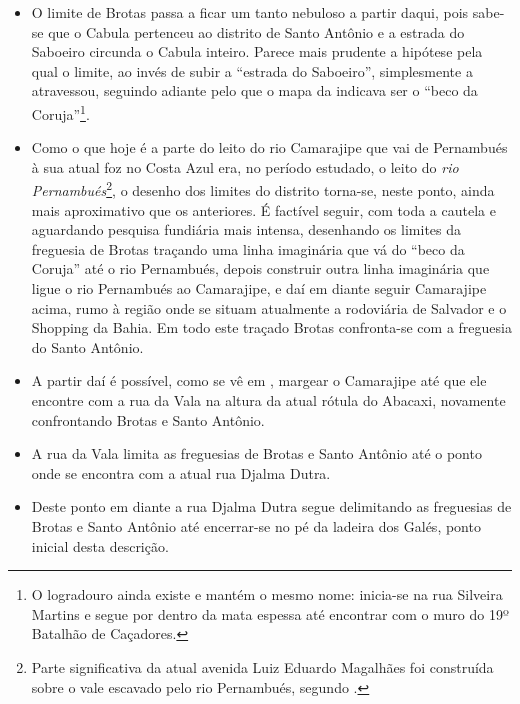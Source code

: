 \begin{itemize}
\item O limite de Brotas passa a ficar um tanto nebuloso a partir daqui, pois sabe-se que o Cabula pertenceu ao distrito de Santo Antônio e a estrada do Saboeiro circunda o Cabula inteiro. Parece mais prudente a hipótese pela qual o limite, ao invés de subir a ``estrada do Saboeiro'', simplesmente a atravessou, seguindo adiante pelo que o mapa da  indicava ser o ``beco da Coruja''\footnote{O logradouro ainda existe e mantém o mesmo nome: inicia-se na rua Silveira Martins e segue por dentro da mata espessa até encontrar com o muro do 19º Batalhão de Caçadores.}.
\item Como o que hoje é a parte do leito do rio Camarajipe que vai de Pernambués à sua atual foz no Costa Azul era, no período estudado, o leito do \textit{rio Pernambués}\footnote{Parte significativa da atual avenida Luiz Eduardo Magalhães foi construída sobre o vale escavado pelo rio Pernambués, segundo \cite{santos_aguas_2010}.}, o desenho dos limites do distrito torna-se, neste ponto, ainda mais aproximativo que os anteriores. É factível seguir, com toda a cautela e aguardando pesquisa fundiária mais intensa, desenhando os limites da freguesia de Brotas traçando uma linha imaginária que vá do ``beco da Coruja'' até o rio Pernambués, depois construir outra linha imaginária que ligue o rio Pernambués ao Camarajipe, e daí em diante seguir Camarajipe acima, rumo à região onde se situam atualmente a rodoviária de Salvador e o Shopping da Bahia. Em todo este traçado Brotas confronta-se com a freguesia do Santo Antônio.
\item A partir daí é possível, como se vê em , margear o Camarajipe até que ele encontre com a rua da Vala na altura da atual rótula do Abacaxi, novamente confrontando Brotas e Santo Antônio.
\item A rua da Vala limita as freguesias de Brotas e Santo Antônio até o ponto onde se encontra com a atual rua Djalma Dutra.
\item Deste ponto em diante a rua Djalma Dutra segue delimitando as freguesias de Brotas e Santo Antônio até encerrar-se no pé da ladeira dos Galés, ponto inicial desta descrição.
\end{itemize}

